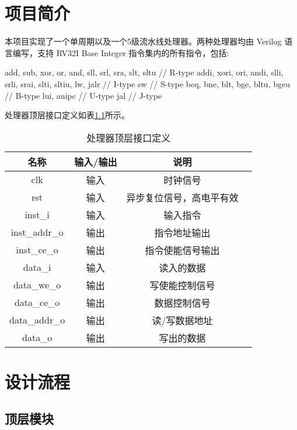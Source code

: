 \documentclass[lang=zh]{sjtureport}
\begin{document}


\tableofcontents


\chapter{项目简介}

本项目实现了一个单周期以及一个5级流水线处理器。两种处理器均由 Verilog 语言编写，支持 RV32I Base Integer 指令集内的所有指令，包括:
\begin{codeblock}
add, sub, xor, or, and, sll, srl, sra, slt, sltu	// R-type
addi, xori, ori, andi, slli, srli, srai, slti, sltiu, lw, jalr	// I-type
sw	// S-type
beq, bne, blt, bge, bltu, bgeu	// B-type
lui, auipc	// U-type
jal	// J-type
\end{codeblock}

处理器顶层接口定义如表\ref{tab:top_io}所示。

\begin{table}[!htp]
	\centering
	\caption{处理器顶层接口定义}
	\label{tab:top_io}
	\begin{tabular}{|c|c|c|c|}
		\hline
		名称 & 输入/输出 & 说明  \\
		\hline
		clk & 输入 & 时钟信号 \\
		\hline
		rst & 输入 & 异步复位信号，高电平有效 \\
		\hline
		inst\_i & 输入 & 输入指令 \\
		\hline
		inst\_addr\_o & 输出 & 指令地址输出 \\
		\hline
		inst\_ce\_o & 输出 & 指令使能信号输出 \\
		\hline
		data\_i & 输入 & 读入的数据 \\
		\hline
		data\_we\_o & 输出 & 写使能控制信号 \\
		\hline
		data\_ce\_o & 输出 & 数据控制信号 \\
		\hline
		data\_addr\_o & 输出 & 读/写数据地址 \\
		\hline
		data\_o & 输出 & 写出的数据 \\
		\hline
	\end{tabular}
\end{table}

\chapter{设计流程}

\section{顶层模块}
\end{document}
